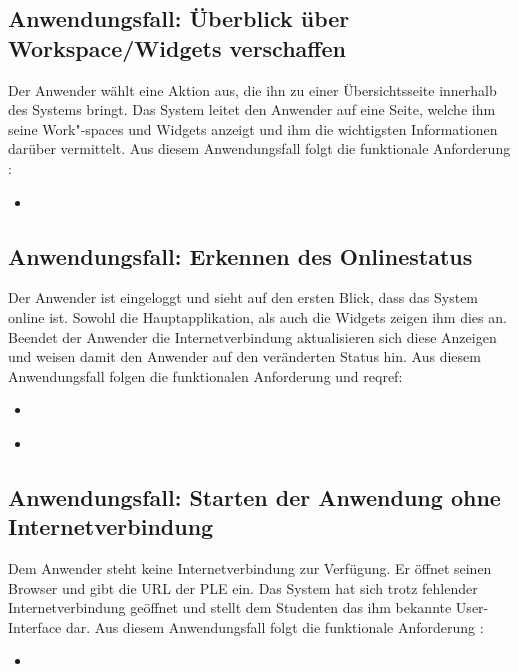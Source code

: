 \subsection{Anwendungsfall: Überblick über Workspace/Widgets verschaffen}
Der Anwender wählt eine Aktion aus, die ihn zu einer Übersichtsseite innerhalb des Systems bringt. Das System leitet den Anwender auf eine Seite, welche ihm seine Work"-spaces und Widgets anzeigt und ihm die wichtigsten Informationen darüber vermittelt. Aus diesem Anwendungsfall folgt die funktionale Anforderung :
\begin{itemize}
 \item \requirementf{\requirementDashboard}\label{requirementDashboard}
\end{itemize}

\subsection{Anwendungsfall: Erkennen des Onlinestatus}
Der Anwender ist eingeloggt und sieht auf den ersten Blick, dass das System online ist. Sowohl die Hauptapplikation, als auch die Widgets zeigen ihm dies an. Beendet der Anwender die Internetverbindung aktualisieren sich diese Anzeigen und weisen damit den Anwender auf den veränderten Status hin. Aus diesem Anwendungsfall folgen die funktionalen Anforderung  und reqref{\requirementOnlineStatusInformUser}:
\begin{itemize}
 \item \requirementf{\requirementCheckOnlineStatus}\label{requirementCheckOnlineStatus}
 \item \requirementf{\requirementOnlineStatusInformUser}\label{requirementOnlineStatusInformUser}
\end{itemize}

\subsection{Anwendungsfall: Starten der Anwendung ohne Internetverbindung}
Dem Anwender steht keine Internetverbindung zur Verfügung. Er öffnet seinen Browser und gibt die URL der PLE ein. Das System hat sich trotz fehlender Internetverbindung geöffnet und stellt dem Studenten das ihm bekannte User-Interface dar. Aus diesem Anwendungsfall folgt die funktionale Anforderung :
\begin{itemize}
 \item \requirementf{\requirementOfflineStart}\label{requirementOfflineStart}
\end{itemize}

